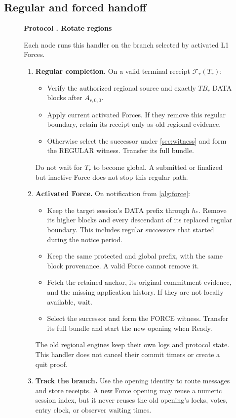 \documentclass[11pt,a4paper]{article}
\newcommand{\FC}{\mathcal F}
\newcommand{\TB}{\mathit{TB}}
\newcounter{protocol}
\newenvironment{protocol}[2]{\begin{figure}[htbp]\refstepcounter{protocol}\label{#1}
\begin{mdframed}[linewidth=.6pt,skipabove=0pt,skipbelow=0pt,
innertopmargin=7pt,innerbottommargin=7pt]\small
\textbf{Protocol \theprotocol. #2}\par\smallskip}{\end{mdframed}\end{figure}}
\begin{document}
\subsection{Regular and forced handoff}
\begin{protocol}{alg:rotation}{Rotate regions}
Each node runs this handler on the branch selected by activated L1 Forces.
\begin{enumerate}[label=\textbf{\arabic*)},itemsep=3pt]
\item \textbf{Regular completion.} On a valid terminal receipt
$\FC_r(T_r)$:
\begin{itemize}
\item Verify the authorized regional source and exactly $\TB_r$ DATA
blocks after $A_{r,0,0}$.
\item Apply current activated Forces. If they remove this regular
boundary, retain its receipt only as old regional evidence.
\item Otherwise select the successor under \cref{sec:witness} and
form the REGULAR witness. Transfer its full bundle.
\end{itemize}
Do not wait for $T_r$ to become global. A submitted or finalized but
inactive Force does not stop this regular path.

\item \textbf{Activated Force.} On notification from \cref{alg:force}:
\begin{itemize}
\item Keep the target session's DATA prefix through $h_*$. Remove its
higher blocks and every descendant of its replaced regular boundary.
This includes regular successors that started during the notice period.
\item Keep the same protected and global prefix, with the same block
provenance. A valid Force cannot remove it.
\item Fetch the retained anchor, its original commitment evidence, and the missing
application history. If they are not locally available, wait.
\item Select the successor and form the FORCE witness. Transfer its
full bundle and start the new opening when Ready.
\end{itemize}
The old regional engines keep their own logs and protocol state. This
handler does not cancel their commit timers or create a quit proof.

\item \textbf{Track the branch.} Use the opening identity to route
messages and store receipts. A new Force opening may reuse a numeric
session index, but it never reuses the old opening's locks, votes,
entry clock, or observer waiting times.
\end{enumerate}
\end{protocol}
\end{document}
